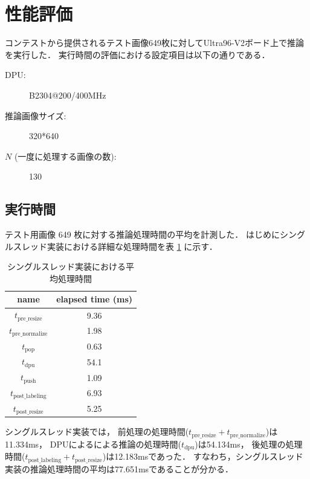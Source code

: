 \section{性能評価}
コンテストから提供されるテスト画像649枚に対してUltra96-V2ボード上で推論を実行した．
実行時間の評価における設定項目は以下の通りである．
\begin{description}
  \item[DPU:] B2304@200/400MHz
  \item[推論画像サイズ:] 320*640
  \item[$N$ (一度に処理する画像の数):] 130
\end{description}
\subsection{実行時間}
テスト用画像 649 枚に対する推論処理時間の平均を計測した．
はじめにシングルスレッド実装における詳細な処理時間を表 \ref{tbl:time-singlethread} に示す．

\begin{table}[h]
  \caption{シングルスレッド実装における平均処理時間} \vspace{1mm}
  \label{tbl:time-singlethread}
  \begin{center}
    \begin{tabular}{cc}
      name & elapsed time (ms) \\ \hline
      $t_{\mathrm{pre\_resize}}$    & 9.36 \\ \hline
      $t_{\mathrm{pre\_normalize}}$ & 1.98 \\ \hline
      $t_{\mathrm{pop}}$            & 0.63 \\ \hline
      $t_{\mathrm{dpu}}$            & 54.1 \\ \hline
      $t_{\mathrm{push}}$           & 1.09 \\ \hline
      $t_{\mathrm{post\_labeling}}$ & 6.93 \\ \hline
      $t_{\mathrm{post\_resize}}$   & 5.25 \\ \hline
    \end{tabular}
  \end{center}
\end{table}

シングルスレッド実装では，
前処理の処理時間($t_{\mathrm{pre\_resize}} + t_{\mathrm{pre\_normalize}}$)は11.334ms，
DPUによるによる推論の処理時間($t_{\mathrm{dpu}}$)は54.134ms，
後処理の処理時間($t_{\mathrm{post\_labeling}} + t_{\mathrm{post\_resize}}$)は12.183msであった．
すなわち，シングルスレッド実装の推論処理時間の平均は77.651msであることが分かる．

